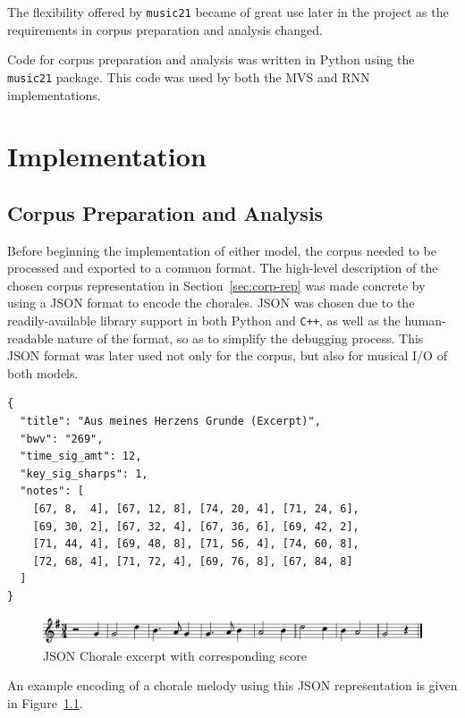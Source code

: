 \documentclass[12pt,a4paper,twoside,openright]{report}
\begin{document}
The flexibility offered by \texttt{music21} became of great use later in the
project as the requirements in corpus preparation and analysis changed.

Code for corpus preparation and analysis was written in Python using the
\texttt{music21} package. This code was used by both the MVS and RNN
implementations.

\chapter{Implementation}\label{chap:impl}

\section{Corpus Preparation and Analysis}

Before beginning the implementation of either model, the corpus needed to be
processed and exported to a common format. The high-level description of the
chosen corpus representation in Section~\ref{sec:corp-rep} was made concrete by
using a JSON format to encode the chorales. JSON was chosen due to the
readily-available library support in both Python and \texttt{C++}, as well as
the human-readable nature of the format, so as to simplify the debugging
process. This JSON format was later used not only for the corpus, but also for
musical I/O of both models.

\vspace{4mm}
\begin{verbatim}
{
  "title": "Aus meines Herzens Grunde (Excerpt)",
  "bwv": "269",
  "time_sig_amt": 12,
  "key_sig_sharps": 1,
  "notes": [
    [67, 8,  4], [67, 12, 8], [74, 20, 4], [71, 24, 6], 
    [69, 30, 2], [67, 32, 4], [67, 36, 6], [69, 42, 2], 
    [71, 44, 4], [69, 48, 8], [71, 56, 4], [74, 60, 8], 
    [72, 68, 4], [71, 72, 4], [69, 76, 8], [67, 84, 8]
  ]
}
\end{verbatim}

\begin{figure}[H]
\centering
\includegraphics[width=450pt]{figs/aus_meines_excerpt.pdf}
\caption{JSON Chorale excerpt with corresponding score}
\label{fig:chorale-excerpt}
\end{figure}

An example encoding of a chorale melody using this JSON representation is given
in Figure~\ref{fig:chorale-excerpt}. 
\end{document}
